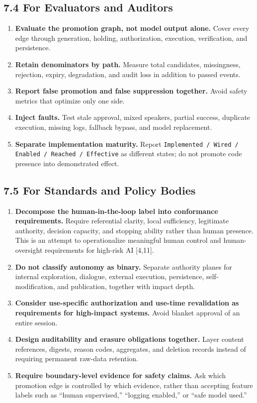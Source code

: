 \subsection{7.4 For Evaluators and Auditors}\label{for-evaluators-and-auditors}

\begin{enumerate}
\def\labelenumi{\arabic{enumi}.}
\tightlist
\item
  \textbf{Evaluate the promotion graph, not model output alone.} Cover every edge through generation, holding, authorization, execution, verification, and persistence.
\item
  \textbf{Retain denominators by path.} Measure total candidates, missingness, rejection, expiry, degradation, and audit loss in addition to passed events.
\item
  \textbf{Report false promotion and false suppression together.} Avoid safety metrics that optimize only one side.
\item
  \textbf{Inject faults.} Test stale approval, mixed speakers, partial success, duplicate execution, missing logs, fallback bypass, and model replacement.
\item
  \textbf{Separate implementation maturity.} Report \passthrough{\lstinline!Implemented / Wired / Enabled / Reached / Effective!} as different states; do not promote code presence into demonstrated effect.
\end{enumerate}

\subsection{7.5 For Standards and Policy Bodies}\label{for-standards-and-policy-bodies}

\begin{enumerate}
\def\labelenumi{\arabic{enumi}.}
\tightlist
\item
  \textbf{Decompose the human-in-the-loop label into conformance requirements.} Require referential clarity, local sufficiency, legitimate authority, decision capacity, and stopping ability rather than human presence. This is an attempt to operationalize meaningful human control and human-oversight requirements for high-risk AI {[}4,11{]}.
\item
  \textbf{Do not classify autonomy as binary.} Separate authority planes for internal exploration, dialogue, external execution, persistence, self-modification, and publication, together with impact depth.
\item
  \textbf{Consider use-specific authorization and use-time revalidation as requirements for high-impact systems.} Avoid blanket approval of an entire session.
\item
  \textbf{Design auditability and erasure obligations together.} Layer content references, digests, reason codes, aggregates, and deletion records instead of requiring permanent raw-data retention.
\item
  \textbf{Require boundary-level evidence for safety claims.} Ask which promotion edge is controlled by which evidence, rather than accepting feature labels such as ``human supervised,'' ``logging enabled,'' or ``safe model used.''
\end{enumerate}

